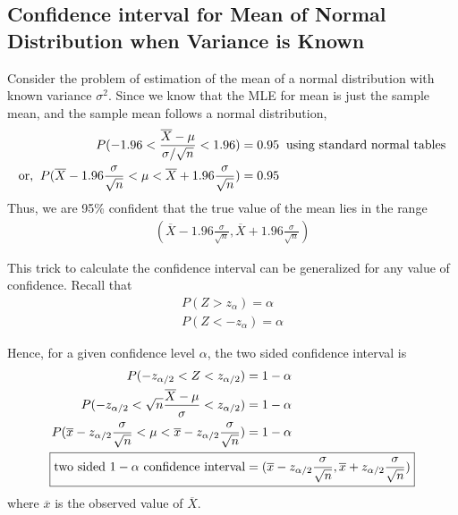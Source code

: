 \documentclass[../probability-notes.tex]{subfiles}
\begin{document}
    \subsection{Confidence interval for Mean of Normal Distribution when Variance is Known}
    Consider the problem of estimation of the mean of a normal distribution with known variance $\sigma^{2}$. Since we know that the MLE for mean is just the sample mean, and the sample mean follows a normal distribution,
    \begin{align*}
        P(-1.96 < \frac{\overline{X} - \mu}{\sigma / \sqrt{n}} < 1.96) &= 0.95 \text{\: using standard normal tables}\\
        \text{or, \:} P(\overline{X} - 1.96\frac{\sigma}{\sqrt{n}}< \mu < \overline{X} + 1.96\frac{\sigma}{\sqrt{n}}) &= 0.95
    \end{align*}
    Thus, we are 95\% confident that the true value of the mean lies in the range
    \begin{align*}
        (\overline{X} - 1.96\frac{\sigma}{\sqrt{n}}, \overline{X} + 1.96\frac{\sigma}{\sqrt{n}})
    \end{align*}

    This trick to calculate the confidence interval can be generalized for any value of confidence. Recall that
    \begin{align*}
        P(Z > z_{\alpha}) = \alpha\\
        P(Z < -z_{\alpha}) = \alpha
    \end{align*}

    Hence, for a given confidence level $\alpha$, the two sided confidence interval is
    \begin{align*}
        P(-z_{\alpha /2} < Z < z_{\alpha /2}) &= 1 - \alpha\\
        P(-z_{\alpha /2} < \sqrt{n}\frac{\overline{X} - \mu}{\sigma} < z_{\alpha /2}) &= 1 - \alpha\\
        P(\overline{x}-z_{\alpha /2}\frac{\sigma}{\sqrt{n}} < \mu < \overline{x}-z_{\alpha /2}\frac{\sigma}{\sqrt{n}}) &= 1 - \alpha\\
        \Aboxed{\text{two sided $1 - \alpha$ confidence interval} &= (\overline{x}-z_{\alpha /2}\frac{\sigma}{\sqrt{n}}, \overline{x}+z_{\alpha /2}\frac{\sigma}{\sqrt{n}})}\\
    \end{align*}
    where $\overline{x}$ is the observed value of $\overline{X}$.
\end{document}
